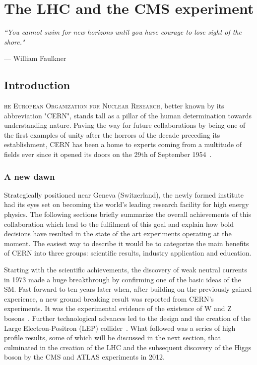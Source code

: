 
\chapter{The LHC and the CMS experiment}
\epigraph{\itshape``You cannot swim for new horizons until you have courage to lose sight of the shore."}{--- \textup{William Faulkner}}


\label{ch:cms_experiment}
\section{Introduction}

\hspace{10pt}\lettrine[lines=2]{}{ he European Organization for Nuclear Research}, better known by its abbreviation "CERN", stands tall as a pillar of the human determination towards understanding nature. Paving the way for future collaborations by being one of the first examples of unity after the horrors of the decade preceding its establishment, CERN has been a home to experts coming from a multitude of fields ever since it opened its doors on the 29th of September 1954~\cite{History_CERN_1}. 

\subsection{A new dawn}

\hspace{10pt} Strategically positioned near Geneva (Switzerland), the newly formed institute had its eyes set on becoming the world's leading research facility for high energy physics. The following sections briefly summarize the overall achievements of this collaboration which lead to the fulfilment of this goal and explain how bold decisions have resulted in the state of the art experiments operating at the moment. The easiest way to describe it would be to categorize the main benefits of CERN into three groups: scientific results, industry application and education.

 \hspace{10pt} Starting with the scientific achievements, the discovery of weak neutral currents~\cite{neutral_currents_1,neutral_currents_2} in 1973 made a huge breakthrough by confirming one of the basic ideas of the SM. Fast forward to ten years later when, after building on the previously gained experience, a new ground breaking result was reported from CERN's experiments. It was the experimental evidence of the existence of W and Z bosons~\cite{WandZ_discovery}. Further technological advances led to the design and the creation of the Large Electron-Positron (LEP) collider~\cite{LEP_TDR}. What followed was a series of high profile results, some of which will be discussed in the next section, that culminated in the creation of the LHC and the subsequent discovery of the Higgs boson by the CMS and ATLAS experiments in 2012.

